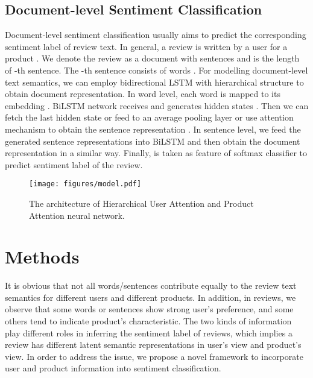 \documentclass[letterpaper]{article} \usepackage{aaai18}  \usepackage{times}  \usepackage{helvet}  \usepackage{courier}  \usepackage{url}  \usepackage{graphicx}  \frenchspacing  \usepackage{amsmath}
\begin{document}
\subsection{Document-level Sentiment Classification}
Document-level sentiment classification usually aims to predict the corresponding sentiment label of review text. In general, a review is written by a user  for a product . We denote the review as a document  with  sentences  and  is the length of -th sentence. The -th sentence  consists of  words . For modelling document-level text semantics, we can employ bidirectional LSTM with hierarchical structure to obtain document representation. In word level, each word  is mapped to its embedding . BiLSTM network receives  and generates hidden states . Then we can fetch the last hidden state  or feed  to an average pooling layer or use attention mechanism to obtain the sentence representation . In sentence level, we feed the generated sentence representations  into BiLSTM and then obtain the document representation  in a similar way. Finally,  is taken as feature of softmax classifier to predict sentiment label of the review.

\begin{figure*}[t]
\centering
\texttt{[image: figures/model.pdf]}
\caption{The architecture of Hierarchical User Attention and Product Attention neural network.}
\label{fig:HUAPA}
\end{figure*}


\section{Methods}
It is obvious that not all words/sentences contribute equally to the review text semantics for different users and different products. In addition, in reviews, we observe that some words or sentences show strong user's preference, and some others tend to indicate product's characteristic. The two kinds of information play different roles in inferring the sentiment label of reviews, which implies a review has different latent semantic representations in user's view and product's view. In order to address the issue, we propose a novel framework to incorporate user and product information into sentiment classification.
\end{document}
